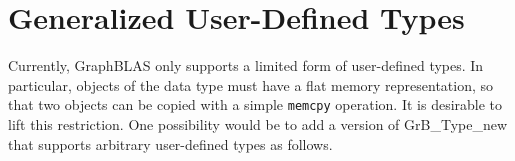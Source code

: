 \section{Generalized User-Defined Types}
\label{Sec:UsrTypes}

Currently, GraphBLAS only supports a limited form of user-defined types. In particular, objects of the
data type must have a flat memory representation, so that two objects can be copied with a simple {\tt memcpy} operation. 
It is desirable to lift this restriction. One possibility would be to add a version of {\sf GrB\_Type\_new} that supports
arbitrary user-defined types as follows.

%
%
%
%
%

